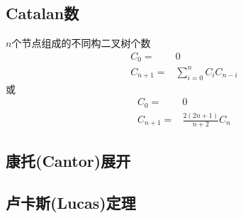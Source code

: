 \subsection{Catalan数}
$n$个节点组成的不同构二叉树个数
\begin{align*}
C_0     = & 0 \\
C_{n+1} = & \sum_{i=0}^n C_i C_{n-i}
\end{align*}
或
\begin{align*}
C_0     = & 0 \\
C_{n+1} = & \frac{2(2n+1)}{n+2} C_n
\end{align*}

\subsection{康托(Cantor)展开}

\subsection{卢卡斯(Lucas)定理}
